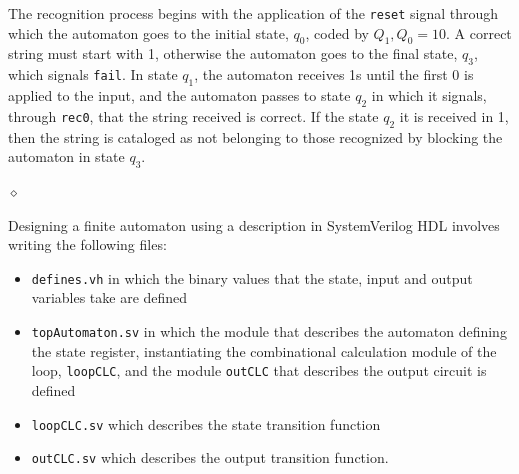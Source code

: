 \begin{exemplu}
The recognition process begins with the application of the {\tt reset} signal through which the automaton goes to the initial state, $q_0$, coded by $Q_1, Q_0 = 10$. A correct string must start with 1, otherwise the automaton goes to the final state, $q_3$, which signals {\tt fail}. In state $q_1$, the automaton receives 1s until the first 0 is applied to the input, and the automaton passes to state $q_2$ in which it signals, through {\tt rec0}, that the string received is correct. If the state $q_2$ it is received in 1, then the string is cataloged as not belonging to those recognized by blocking the automaton in state $q_3$.


$\diamond$
\end{exemplu}

Designing a finite automaton using a description in SystemVerilog HDL involves writing the following files:
\begin{itemize}
\item {\tt defines.vh} in which the binary values that the state, input and output variables take are defined
\item {\tt topAutomaton.sv} in which the module that describes the automaton defining the state register, instantiating the combinational calculation module of the loop, {\tt loopCLC}, and the module {\tt outCLC} that describes the output circuit is defined
\item {\tt loopCLC.sv} which describes the state transition function
\item {\tt outCLC.sv} which describes the output transition function.
\end{itemize}


